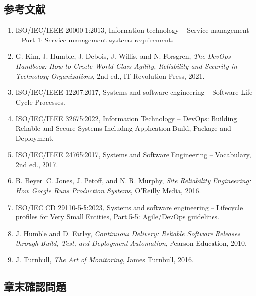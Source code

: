 \documentclass[a4paper,11pt]{ltjsarticle}
\numberwithin{figure}{section}
\numberwithin{table}{section}
\begin{document}
\subsection{参考文献}

\begin{enumerate}[label={\arabic*.}]
  \item ISO/IEC/IEEE 20000-1:2013, Information technology -- Service management -- Part 1: Service management systems requirements.
  \item G. Kim, J. Humble, J. Debois, J. Willis, and N. Forsgren, \textit{The DevOps Handbook: How to Create World-Class Agility, Reliability and Security in Technology Organizations}, 2nd ed., IT Revolution Press, 2021.
  \item ISO/IEC/IEEE 12207:2017, Systems and software engineering -- Software Life Cycle Processes.
  \item ISO/IEC/IEEE 32675:2022, Information Technology -- DevOps: Building Reliable and Secure Systems Including Application Build, Package and Deployment.
  \item ISO/IEC/IEEE 24765:2017, Systems and Software Engineering -- Vocabulary, 2nd ed., 2017.
  \item B. Beyer, C. Jones, J. Petoff, and N. R. Murphy, \textit{Site Reliability Engineering: How Google Runs Production Systems}, O'Reilly Media, 2016.
  \item ISO/IEC CD 29110-5-5:2023, Systems and software engineering -- Lifecycle profiles for Very Small Entities, Part 5-5: Agile/DevOps guidelines.
  \item J. Humble and D. Farley, \textit{Continuous Delivery: Reliable Software Releases through Build, Test, and Deployment Automation}, Pearson Education, 2010.
  \item J. Turnbull, \textit{The Art of Monitoring}, James Turnbull, 2016.
\end{enumerate}

\subsection{章末確認問題}
\end{document}
